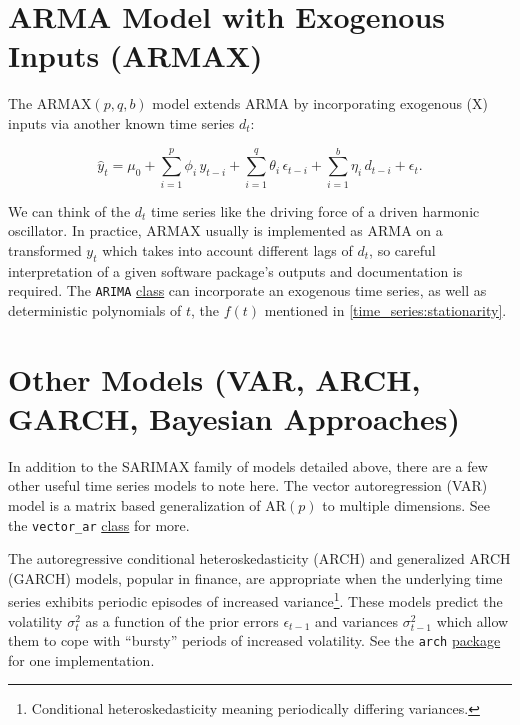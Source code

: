 \section{ARMA Model with Exogenous Inputs (ARMAX)}
\label{time_series:ARMAX}

The $\text{ARMAX}\left(p,q,b\right)$ model
extends ARMA by incorporating exogenous (X) inputs
via another known time series $d_{t}$:

\begin{equation}\label{eq:time_series:ARMAX}
\hat{y}_{t} = \mu_{0} + \sum_{i=1}^{p} \phi_{i}\, y_{t-i} + \sum_{i=1}^{q} \theta_{i}\, \epsilon_{t-i} + \sum_{i=1}^{b} \eta_{i}\, d_{t-i} + \epsilon_{t}.
\end{equation}

We can think of the $d_{t}$ time series like the driving force of a driven harmonic oscillator.
In practice, ARMAX usually is implemented as ARMA on
a transformed $y_{t}$ which takes into account different lags of $d_{t}$,
so careful interpretation of a given software package's outputs and documentation is required.
The \texttt{ARIMA}
\href{https://www.statsmodels.org/stable/generated/statsmodels.tsa.arima.model.ARIMA.html}{class}
can incorporate an exogenous time series,
as well as deterministic polynomials of $t$,
\ie the $f\left(t\right)$ mentioned in \cref{time_series:stationarity}.

\section{Other Models (VAR, ARCH, GARCH, Bayesian Approaches)}
\label{time_series:other_models}

In addition to the SARIMAX family of models detailed above,
there are a few other useful time series models to note here.
The vector autoregression (VAR) model is a matrix based
generalization of $\text{AR}\left(p\right)$ to multiple dimensions.
See the \texttt{vector\_ar}
\href{https://www.statsmodels.org/stable/generated/statsmodels.tsa.vector_ar.var_model.VAR.html}{class} for more.

The autoregressive conditional heteroskedasticity (ARCH) and generalized ARCH (GARCH) models,
popular in finance, are appropriate when the underlying time series
exhibits periodic episodes of increased variance\footnote{Conditional heteroskedasticity meaning periodically differing variances.}.
These models predict the volatility $\sigma_{t}^{2}$ as a function of
the prior errors $\epsilon_{t-1}$ and variances $\sigma_{t-1}^{2}$
which allow them to cope with ``bursty'' periods of increased volatility.
See the \texttt{arch}
\href{https://arch.readthedocs.io/en/stable/univariate/introduction.html}{package}
for one implementation.

